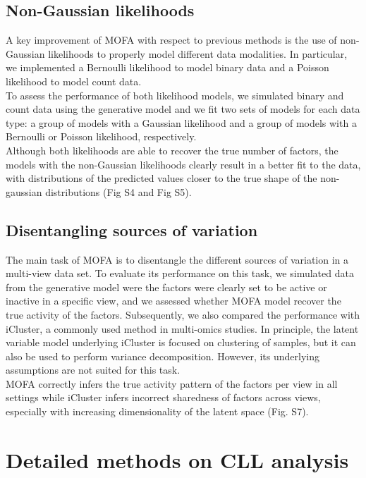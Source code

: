 \documentclass[10pt, a4paper,openany]{report}
\begin{document}
\subsection{Non-Gaussian likelihoods}
A key improvement of MOFA with respect to previous methods is the use of non-Gaussian likelihoods to properly model different data modalities. In particular, we implemented a Bernoulli likelihood to model binary data and a Poisson likelihood to model count data.\\
To assess the performance of both likelihood models, we simulated binary and count data using the generative model and we fit two sets of models for each data type: a group of models with a Gaussian likelihood and a group of models with a Bernoulli or Poisson likelihood, respectively.\\
Although both likelihoods are able to recover the true number of factors, the models with the non-Gaussian likelihoods clearly result in a better fit to the data, with distributions of the predicted values closer to the true shape of the non-gaussian distributions (Fig S4 and Fig S5). 

\subsection{Disentangling sources of variation}
The main task of MOFA is to disentangle the different sources of variation in a multi-view data set. To evaluate its performance on this task, we simulated data from the generative model were the factors were clearly set to be active or inactive in a specific view, and we assessed whether  MOFA model recover the true activity of the factors. Subsequently, we also compared the performance with iCluster, a commonly used method in multi-omics studies. In principle, the latent variable model underlying iCluster is focused on clustering of samples, but it can also be used to perform variance decomposition. However, its underlying assumptions are not suited for this task.\\ 
MOFA correctly infers the true activity pattern of the factors per view in all settings while iCluster infers incorrect sharedness of factors across views, especially with increasing dimensionality of the latent space (Fig. S7).



\section{Detailed methods on CLL analysis}
\end{document}
